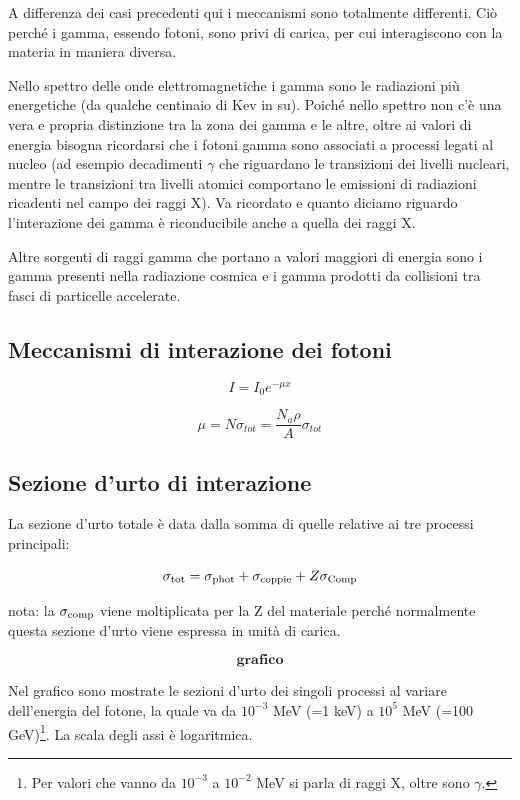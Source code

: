 A differenza dei casi precedenti qui i meccanismi sono totalmente differenti. Ciò perché i gamma, essendo fotoni, sono privi di carica, per cui interagiscono con la materia in maniera diversa.

Nello spettro delle onde elettromagnetiche i gamma sono le radiazioni più energetiche (da qualche centinaio di Kev in su). Poiché nello spettro non c'è una vera e propria distinzione tra la zona dei gamma e le altre, oltre ai valori di energia bisogna ricordarsi che i fotoni gamma sono associati a processi legati al nucleo (ad esempio decadimenti $\gamma$ che riguardano le transizioni dei livelli nucleari, mentre le transizioni tra livelli atomici comportano le emissioni di radiazioni ricadenti nel campo dei raggi X). Va ricordato e quanto diciamo riguardo l'interazione dei gamma è riconducibile anche a quella dei raggi X.

Altre sorgenti di raggi gamma che portano a valori maggiori di energia sono i gamma presenti nella radiazione cosmica e i gamma prodotti da collisioni tra fasci di particelle accelerate.

\subsection{Meccanismi di interazione dei fotoni}

$$I=I_0 e^{-\mu x}$$

$$\mu=N \sigma_{tot}
=\frac{N_a \rho}{A} \sigma_{tot}$$

\subsection{Sezione d'urto di interazione}

La sezione d'urto totale è data dalla somma di quelle relative ai tre processi principali:

$$\sigma_{\rm tot}=\sigma_{\rm phot} + \sigma_{\rm coppie} + Z \sigma_{\rm Comp}$$

nota: la $\sigma_{\rm comp}$ viene moltiplicata per la Z del materiale perché normalmente questa sezione d'urto viene espressa in unità di carica.

$$\textbf{grafico}$$

Nel grafico sono mostrate le sezioni d'urto dei singoli processi al variare dell'energia del fotone, la quale va da $10^{-3}$ MeV (=1 keV) a $10^5$ MeV (=100 GeV)\footnote{Per valori che vanno da $10^{-3}$ a $10^{-2}$ MeV si parla di raggi X, oltre sono $\gamma$.}. La scala degli assi è logaritmica.

